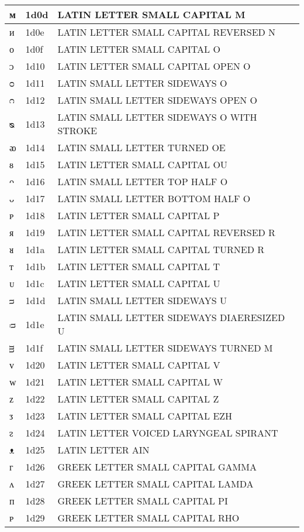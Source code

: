 \documentclass[12pt,letterpaper,openany]{book}
\begin{document}
\begin{center}
\begin{supertabular}{|m{0.25in}|m{0.5in}|m{4in}|}
ᴍ & 1d0d & LATIN LETTER SMALL CAPITAL M\\\hline
ᴎ & 1d0e & LATIN LETTER SMALL CAPITAL REVERSED N\\\hline
ᴏ & 1d0f & LATIN LETTER SMALL CAPITAL O\\\hline
ᴐ & 1d10 & LATIN LETTER SMALL CAPITAL OPEN O\\\hline
ᴑ & 1d11 & LATIN SMALL LETTER SIDEWAYS O\\\hline
ᴒ & 1d12 & LATIN SMALL LETTER SIDEWAYS OPEN O\\\hline
ᴓ & 1d13 & LATIN SMALL LETTER SIDEWAYS O WITH STROKE\\\hline
ᴔ & 1d14 & LATIN SMALL LETTER TURNED OE\\\hline
ᴕ & 1d15 & LATIN LETTER SMALL CAPITAL OU\\\hline
ᴖ & 1d16 & LATIN SMALL LETTER TOP HALF O\\\hline
ᴗ & 1d17 & LATIN SMALL LETTER BOTTOM HALF O\\\hline
ᴘ & 1d18 & LATIN LETTER SMALL CAPITAL P\\\hline
ᴙ & 1d19 & LATIN LETTER SMALL CAPITAL REVERSED R\\\hline
ᴚ & 1d1a & LATIN LETTER SMALL CAPITAL TURNED R\\\hline
ᴛ & 1d1b & LATIN LETTER SMALL CAPITAL T\\\hline
ᴜ & 1d1c & LATIN LETTER SMALL CAPITAL U\\\hline
ᴝ & 1d1d & LATIN SMALL LETTER SIDEWAYS U\\\hline
ᴞ & 1d1e & LATIN SMALL LETTER SIDEWAYS DIAERESIZED U\\\hline
ᴟ & 1d1f & LATIN SMALL LETTER SIDEWAYS TURNED M\\\hline
ᴠ & 1d20 & LATIN LETTER SMALL CAPITAL V\\\hline
ᴡ & 1d21 & LATIN LETTER SMALL CAPITAL W\\\hline
ᴢ & 1d22 & LATIN LETTER SMALL CAPITAL Z\\\hline
ᴣ & 1d23 & LATIN LETTER SMALL CAPITAL EZH\\\hline
ᴤ & 1d24 & LATIN LETTER VOICED LARYNGEAL SPIRANT\\\hline
ᴥ & 1d25 & LATIN LETTER AIN\\\hline
ᴦ & 1d26 & GREEK LETTER SMALL CAPITAL GAMMA\\\hline
ᴧ & 1d27 & GREEK LETTER SMALL CAPITAL LAMDA\\\hline
ᴨ & 1d28 & GREEK LETTER SMALL CAPITAL PI\\\hline
ᴩ & 1d29 & GREEK LETTER SMALL CAPITAL RHO\\\hline

\end{supertabular}
\end{center}
\end{document}
